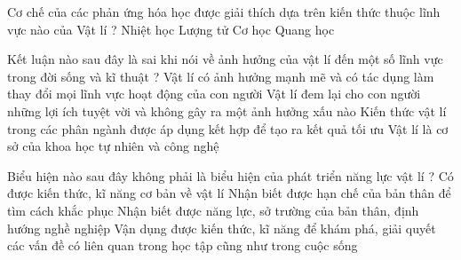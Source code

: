 \begin{ex}
Cơ chế của các phản ứng hóa học được giải thích dựa trên kiến thức thuộc lĩnh vực nào của Vật lí ?
\choice
{Nhiệt học}
{\True Lượng tử}
{Cơ học}
{Quang học}
\end{ex}

\begin{ex}
Kết luận nào sau đây là sai khi nói về ảnh hưởng của vật lí đến một số lĩnh vực trong đời sống và kĩ thuật ?
\choice
{Vật lí có ảnh hưởng mạnh mẽ và có tác dụng làm thay đổi mọi lĩnh vực hoạt động của con người}
{\True Vật lí đem lại cho con người những lợi ích tuyệt vời và không gây ra một ảnh hưởng xấu nào}
{Kiến thức vật lí trong các phân ngành được áp dụng kết hợp để tạo ra kết quả tối ưu}
{Vật lí là cơ sở của khoa học tự nhiên và công nghệ}
\end{ex}

\begin{ex}
Biểu hiện nào sau đây không phải là biểu hiện của phát triển năng lực vật lí ?
\choice
{Có được kiến thức, kĩ năng cơ bản về vật lí}
{\True Nhận biết được hạn chế của bản thân để tìm cách khắc phục}
{Nhận biết được năng lực, sở trường của bản thân, định hướng nghề nghiệp}
{Vận dụng được kiến thức, kĩ năng để khám phá, giải quyết các vấn đề có liên quan trong học tập cũng như trong cuộc sống}
\end{ex}

